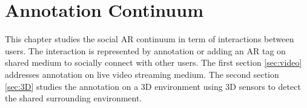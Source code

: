 \chapter{Annotation Continuum} %
\label{ch:annotation} %

This chapter studies the social AR continuum in term of interactions between users. The interaction is represented by annotation or adding an AR tag on shared medium to socially connect with other users. The first section \ref{sec:video} addresses annotation on live video streaming medium. The second section \ref{sec:3D} studies the annotation on a 3D environment using 3D sensors to detect the shared surrounding environment. 






